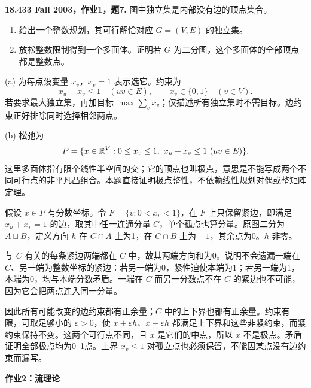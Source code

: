 \begin{exercise}\label{mit:18433-a1-q7}
\textbf{18.433 Fall 2003，作业1，题7.}
图中独立集是内部没有边的顶点集合。
\begin{enumerate}[label=(\alph*)]
\item 给出一个整数规划，其可行解恰对应 $G=(V,E)$ 的独立集。
\item 放松整数限制得到一个多面体。证明若 $G$ 为二分图，这个多面体的全部顶点都是整数点。
\end{enumerate}
\end{exercise}
\begin{solution}
(a) 为每点设变量 $x_v$，$x_v=1$ 表示选它。约束为
\[
 x_u+x_v\le1\quad(uv\in E),\qquad x_v\in\{0,1\}\quad(v\in V).
\]
若要求最大独立集，再加目标 $\max\sum_v x_v$；仅描述所有独立集时不需目标。边约束正好排除同时选择相邻两点。

(b) 松弛为
\[
 P=\{x\in\R^V:0\le x_v\le1,\ x_u+x_v\le1\ (uv\in E)\}.
\]
这里多面体指有限个线性半空间的交；它的顶点也叫极点，意思是不能写成两个不同可行点的非平凡凸组合。本题直接证明极点整性，不依赖线性规划对偶或整矩阵定理。

假设 $x\in P$ 有分数坐标。令 $F=\{v:0<x_v<1\}$，在 $F$ 上只保留紧边，即满足 $x_u+x_v=1$ 的边，取其中任一连通分量 $C$，单个孤点也算分量。原图二分为 $A\sqcup B$，定义方向 $h$ 在 $C\cap A$ 上为1，在 $C\cap B$ 上为 $-1$，其余点为0。$h$ 非零。

与 $C$ 有关的每条紧边两端都在 $C$ 中，故其两端方向和为0。说明不会遗漏一端在 $C$、另一端为整数坐标的紧边：若另一端为0，紧性迫使本端为1；若另一端为1，本端为0，均与本端分数矛盾。一端在 $C$ 而另一分数点不在 $C$ 的紧边也不可能，因为它会把两点连入同一分量。

因此所有可能改变的边约束都有正余量；$C$ 中的上下界也都有正余量。约束有限，可取足够小的 $\varepsilon>0$，使 $x+\varepsilon h$、$x-\varepsilon h$ 都满足上下界和这些非紧约束，而紧约束保持不变。这两个可行点不同，且 $x$ 是它们的中点，所以 $x$ 不是极点。矛盾证明全部极点均为0--1点。上界 $x_v\le1$ 对孤立点也必须保留，不能因某点没有边约束而漏写。
\end{solution}

\par\addvspace{7pt}\noindent\textbf{作业2：流理论}

